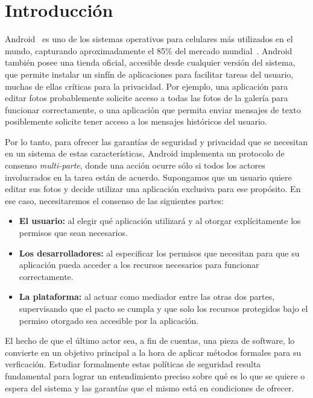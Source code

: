 \chapter{Introducción}

Android~\cite{android-proyect} es uno de los sistemas operativos para celulares más utilizados en el
mundo, capturando aproximadamente el 85\% del mercado mundial~\cite{idc-report}. Android también
posee una tienda oficial, accesible desde cualquier versión del sistema, que permite instalar un
sinfín de aplicaciones para facilitar tareas del usuario, muchas de ellas críticas para la
privacidad. Por ejemplo, una aplicación para editar fotos probablemente solicite acceso a todas las
fotos de la galería para funcionar correctamente, o una aplicación que permita enviar mensajes de
texto posiblemente solicite tener acceso a los mensajes históricos del usuario.

Por lo tanto, para ofrecer las garantías de seguridad y privacidad que se necesitan en un sistema de
estas características, Android implementa un protocolo de consenso \textit{multi-parte}, donde una
acción ocurre sólo si todos los actores involucrados en la tarea están de acuerdo. Supongamos que un
usuario quiere editar sus fotos y decide utilizar una aplicación exclusiva para ese propósito. En
ese caso, necesitaremos el consenso de las siguientes partes:

\begin{itemize}
    \item \textbf{El usuario:} al elegir qué aplicación utilizará y al otorgar explícitamente los
          permisos que sean necesarios.
    \item \textbf{Los desarrolladores:} al especificar los permisos que necesitan para que su
          aplicación pueda acceder a los recursos necesarios para funcionar correctamente.
    \item \textbf{La plataforma:} al actuar como mediador entre las otras dos partes,
          supervisando que el pacto se cumpla y que solo los recursos protegidos bajo el permiso
          otorgado sea accesible por la aplicación.
\end{itemize}

El hecho de que el último actor sea, a fin de cuentas, una pieza de software, lo convierte en un
objetivo principal a la hora de aplicar métodos formales para su verficación. Estudiar formalmente
estas políticas de seguridad resulta fundamental para lograr un entendimiento preciso sobre qué es
lo que se quiere o espera del sistema y las garantías que el mismo está en condiciones de ofrecer.

